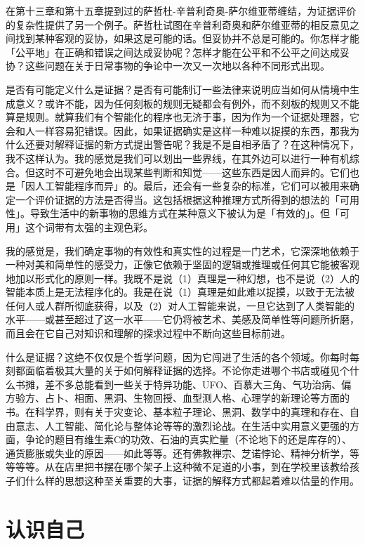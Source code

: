 \documentclass[
  12pt,
  twoside,
  openright,
  oldfontcommands,
]{memoir}
\begin{document}
在第十三章和第十五章提到过的萨哲杜-辛普利奇奥-萨尔维亚蒂缠结，为证据评价的复杂性提供了另一个例子。萨哲杜试图在辛普利奇奥和萨尔维亚蒂的相反意见之间找到某种客观的妥协，如果这是可能的话。但妥协并不总是可能的。你怎样才能「公平地」在正确和错误之间达成妥协呢？怎样才能在公平和不公平之间达成妥协？这些问题在关于日常事物的争论中一次又一次地以各种不同形式出现。

是否有可能定义什么是证据？是否有可能制订一些法律来说明应当如何从情境中生成意义？或许不能，因为任何刻板的规则无疑都会有例外，而不刻板的规则又不能算是规则。就算我们有个智能化的程序也无济于事，因为作为一个证据处理器，它会和人一样容易犯错误。因此，如果证据确实是这样一种难以捉摸的东西，那我为什么还要对解释证据的新方式提出警告呢？我是不是自相矛盾了？在这种情况下，我不这样认为。我的感觉是我们可以划出一些界线，在其外边可以进行一种有机综合。但这时不可避免地会出现某些判断和知觉------这些东西是因人而异的。它们也是「因人工智能程序而异」的。最后，还会有一些复杂的标准，它们可以被用来确定一个评价证据的方法是否得当。这包括根据这种推理方式所得到的想法的「可用性」。导致生活中的新事物的思维方式在某种意义下被认为是「有效的」。但「可用」这个词带有太强的主观色彩。

我的感觉是，我们确定事物的有效性和真实性的过程是一门艺术，它深深地依赖于一种对美和简单性的感受力，正像它依赖于坚固的逻辑或推理或任何其它能被客观地加以形式化的原则一样。我既不是说（1）真理是一种幻想，也不是说（2）人的智能本质上是无法程序化的。我是在说（1）真理是如此难以捉摸，以致于无法被任何人或人群所彻底获得，以及（2）对人工智能来说，一旦它达到了人类智能的水平------或甚至超过了这一水平------它仍将被艺术、美感及简单性等问题所折磨，而且会在它自己对知识和理解的探求过程中不断向这些目标前进。

什么是证据？这绝不仅仅是个哲学问题，因为它闯进了生活的各个领域。你每时每刻都面临着极其大量的关于如何解释证据的选择。不论你走进哪个书店或碰见个什么书摊，差不多总能看到一些关于特异功能、UFO、百慕大三角、气功治病、偏方验方、占卜、相面、黑洞、生物回授、血型测人格、心理学的新理论等方面的书。在科学界，则有关于灾变论、基本粒子理论、黑洞、数学中的真理和存在、自由意志、人工智能、简化论与整体论等等的激烈论战。在生活中实用意义更强的方面，争论的题目有维生素C的功效、石油的真实贮量（不论地下的还是库存的）、通货膨胀或失业的原因------如此等等。还有佛教禅宗、芝诺悖论、精神分析学，等等等等。从在店里把书摆在哪个架子上这种微不足道的小事，到在学校里该教给孩子们什么样的思想这种至关重要的大事，证据的解释方式都起着难以估量的作用。

\section{认识自己}
\end{document}
